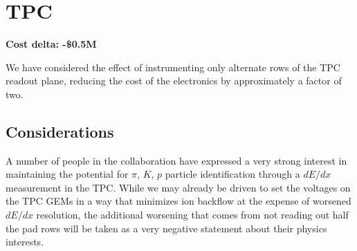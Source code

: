 \section*{TPC}
\label{tpc}

\textbf{Cost delta: -\$0.5M}

We have considered the effect of instrumenting only alternate rows of
the TPC readout plane, reducing the cost of the electronics by
approximately a factor of two.


\subsection*{Considerations}

A number of people in the collaboration have expressed a very strong
interest in maintaining the potential for $\pi$, $K$, $p$ particle
identification through a $dE/dx$ measurement in the TPC.  While we may
already be driven to set the voltages on the TPC GEMs in a way that
minimizes ion backflow at the expense of worsened $dE/dx$ resolution,
the additional worsening that comes from not reading out half the pad
rows will be taken as a very negative statement about their physics
interests.


